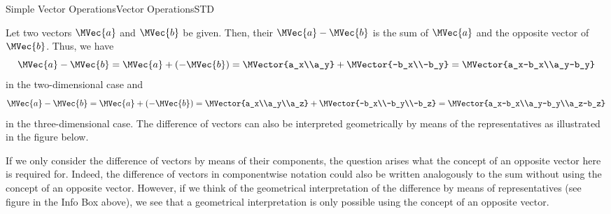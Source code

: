 \begin{MXContent}{Simple Vector Operations}{Vector Operations}{STD}
\begin{MInfo}
Let two vectors $\MVec{a}$ and $\MVec{b}$ be given. Then, their  
$\MVec{a}-\MVec{b}$ is the sum of $\MVec{a}$ and the opposite vector of $\MVec{b}$. Thus, we have
\[
 \MVec{a}-\MVec{b}=\MVec{a}+(-\MVec{b})=\MVector{a_x\\a_y}+\MVector{-b_x\\-b_y}=\MVector{a_x-b_x\\a_y-b_y}
\]
in the two-dimensional case and
\[
 \MVec{a}-\MVec{b}=\MVec{a}+(-\MVec{b})=\MVector{a_x\\a_y\\a_z}+\MVector{-b_x\\-b_y\\-b_z}=\MVector{a_x-b_x\\a_y-b_y\\a_z-b_z}
\]
in the three-dimensional case. The difference of vectors can also be interpreted geometrically by means 
of the representatives as illustrated in the figure below.
\begin{center}
% 
\end{center}
\end{MInfo}

If we only consider the difference of vectors by means of their components,
the question arises what the concept of an opposite vector here is required for. 
Indeed, the difference of vectors in componentwise notation could also be written analogously to the sum 
without using the concept of an opposite vector. However, if we think of the geometrical interpretation 
of the difference by means of representatives (see figure in the Info Box above), we see that a geometrical 
interpretation is only possible using the concept of an opposite vector. 


\end{MXContent}

